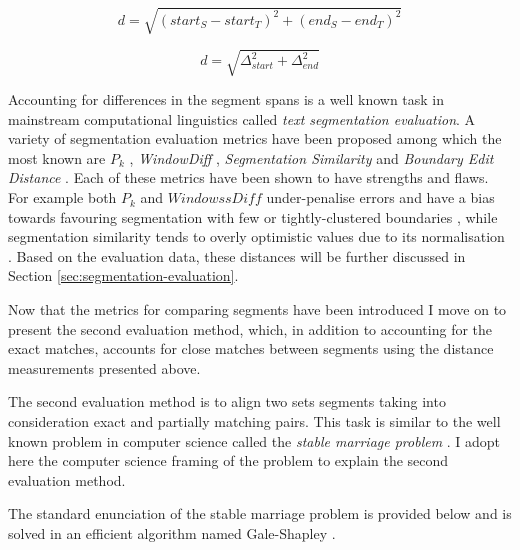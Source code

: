     \begin{equation} \label{eq:distance}
    d= \sqrt{(start_S - start_T)^{2}+(end_S-end_T)^{2}}
    \end{equation}
    
    \begin{equation} \label{eq:distance-simpliefied}
    d= \sqrt{\varDelta_{start} ^{2}+\varDelta_{end}^{2}}
    \end{equation}
    
    Accounting for differences in the segment spans is a well known task in mainstream computational linguistics called \textit{text segmentation evaluation}. A variety of segmentation evaluation metrics have been proposed among which the most known are $P_k$ \citep[198--200]{beeferman1999statistical}, \textit{WindowDiff} \citep[10]{pevzner2002critique}, \textit{Segmentation Similarity} \citep[154-156]{fournier2012segmentation} and \textit{Boundary Edit Distance} \citep{fournier2013evaluating}. Each of these metrics have been shown to have strengths and flaws. For example both $P_k$ and $WindowssDiff$ under-penalise errors \citep{lamprier2007evaluation} and have a bias towards favouring segmentation with few or tightly-clustered boundaries \citep{niekrasz2010unbiased}, while segmentation similarity tends to overly optimistic values due to its normalisation \citep{fournier2013evaluating}. Based on the evaluation data, these distances will be further discussed in Section \ref{sec:segmentation-evaluation}. 
    

    Now that the metrics for comparing segments have been introduced I move on to present the second evaluation method, which, in addition to accounting for the exact matches, accounts for close matches between segments using the distance measurements presented above. 
    
    The second evaluation method is to align two sets segments taking into consideration exact and partially matching pairs. This task is similar to the well known problem in computer science called the \textit{stable marriage problem} \citep{Gusfield1989}. I adopt here the computer science framing of the problem to explain the second evaluation method.
    
    The standard enunciation of the stable marriage problem is provided below and is solved in an efficient algorithm named Gale-Shapley \citep{Gale1962}.
    
